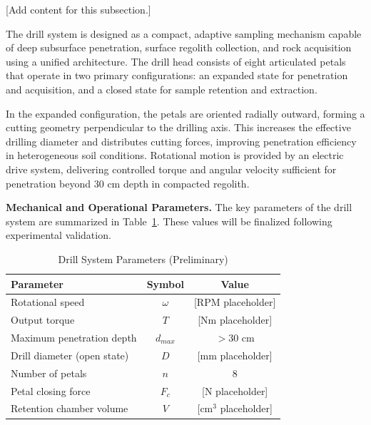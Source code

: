 

[Add content for this subsection.]

The drill system is designed as a compact, adaptive sampling mechanism capable of deep subsurface penetration, surface regolith collection, and rock acquisition using a unified architecture. The drill head consists of eight articulated petals that operate in two primary configurations: an expanded state for penetration and acquisition, and a closed state for sample retention and extraction.

In the expanded configuration, the petals are oriented radially outward, forming a cutting geometry perpendicular to the drilling axis. This increases the effective drilling diameter and distributes cutting forces, improving penetration efficiency in heterogeneous soil conditions. Rotational motion is provided by an electric drive system, delivering controlled torque and angular velocity sufficient for penetration beyond 30 cm depth in compacted regolith.

\textbf{Mechanical and Operational Parameters.} The key parameters of the drill system are summarized in Table~\ref{tab:drill_params}. These values will be finalized following experimental validation.

\begin{table}[H]
\centering
\caption{Drill System Parameters (Preliminary)}
\label{tab:drill_params}
\begin{tabular}{|l|c|c|}
\hline
Parameter & Symbol & Value \\
\hline
Rotational speed & $\omega$ & [RPM placeholder] \\
Output torque & $T$ & [Nm placeholder] \\
Maximum penetration depth & $d_{max}$ & $> 30$ cm \\
Drill diameter (open state) & $D$ & [mm placeholder] \\
Number of petals & $n$ & 8 \\
Petal closing force & $F_c$ & [N placeholder] \\
Retention chamber volume & $V$ & [cm$^3$ placeholder] \\
\hline
\end{tabular}
\end{table}

